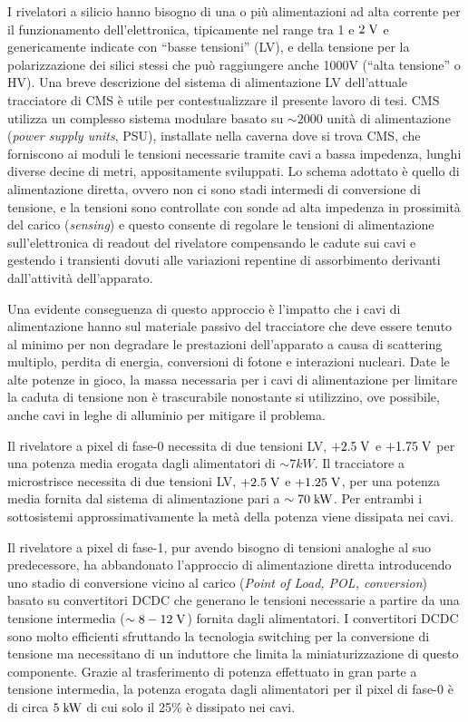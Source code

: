 I rivelatori a silicio hanno bisogno di una o pi\`u alimentazioni ad alta corrente per il funzionamento dell'elettronica, tipicamente nel range tra 1 e $2\rm \; V$ e genericamente indicate con ``basse tensioni'' (LV), e della tensione per la polarizzazione dei silici stessi che pu\`o raggiungere anche 1000V (``alta tensione'' o HV). Una breve descrizione del sistema di alimentazione LV dell'attuale tracciatore di CMS \`e utile per contestualizzare il presente lavoro di tesi. CMS utilizza un complesso sistema modulare basato su $\sim 2000$ unit\`a di alimentazione ({\em power supply units}, PSU), installate nella caverna dove si trova CMS, che forniscono ai moduli le tensioni necessarie tramite cavi a bassa impedenza, lunghi diverse decine di metri,
appositamente sviluppati. Lo schema adottato \`e quello di alimentazione diretta, ovvero non ci sono stadi intermedi di conversione di tensione, e la tensioni sono controllate con sonde ad alta impedenza in prossimit\`a del carico ({\em sensing}) e questo consente di regolare le tensioni di alimentazione sull’elettronica di readout del rivelatore compensando le cadute sui cavi e gestendo i transienti dovuti alle variazioni repentine di assorbimento derivanti dall'attivit\`a dell'apparato.

Una evidente conseguenza di questo approccio \`e l'impatto che i cavi di alimentazione hanno sul materiale passivo del tracciatore che deve essere tenuto al minimo per non degradare le prestazioni dell'apparato a causa di scattering multiplo, perdita di energia, conversioni di fotone e interazioni nucleari.  
Date le alte potenze in gioco, la massa necessaria per i cavi di alimentazione per limitare la caduta di tensione non \`e trascurabile nonostante si utilizzino, ove possibile, anche cavi in leghe di alluminio per mitigare il problema.

Il rivelatore a pixel di fase-0 necessita di due tensioni LV, $+2.5\rm \; V$ e $+1.75\rm \; V$ per una potenza media erogata dagli alimentatori di $\sim 7kW$. Il tracciatore a microstrisce necessita di due tensioni LV, $+2.5\rm \; V$ e $+1.25\rm \; V$, per una potenza media fornita dal sistema di alimentazione pari a $\sim 70\rm \; kW$. Per entrambi i sottosistemi approssimativamente la met\`a della potenza viene dissipata nei cavi.

Il rivelatore a pixel di fase-1, pur avendo bisogno di tensioni analoghe al suo predecessore, ha abbandonato l'approccio di alimentazione diretta introducendo uno stadio di conversione vicino al carico ({\em Point of Load, POL, conversion}) basato su convertitori DCDC che generano le tensioni necessarie a partire da una tensione intermedia ($\sim 8-12\rm \; V$) fornita dagli alimentatori. I convertitori DCDC sono molto efficienti sfruttando la tecnologia switching per la conversione di tensione ma necessitano di un induttore che limita la miniaturizzazione di questo componente. Grazie al trasferimento di potenza effettuato in gran parte a tensione intermedia, la potenza erogata dagli alimentatori per il pixel di fase-0 \`e di circa $5\rm \; kW$ di cui solo il 25\% \`e dissipato nei cavi.

